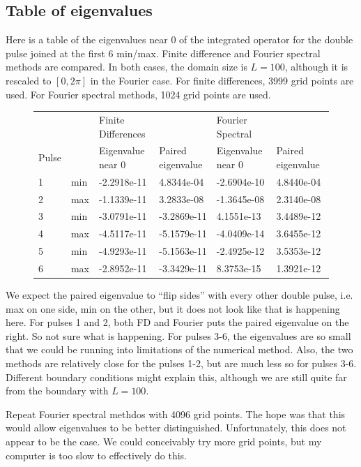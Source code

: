 \documentclass[12pt]{article}
\begin{document}
\subsection*{Table of eigenvalues}
Here is a table of the eigenvalues near 0 of the integrated operator for the double pulse joined at the first 6 min/max. Finite difference and Fourier spectral methods are compared. In both cases, the domain size is $L = 100$, although it is rescaled to $[0, 2\pi]$ in the Fourier case. For finite differences, 3999 grid points are used. For Fourier spectral methods, 1024 grid points are used.

\begin{figure}[H]
\begin{tabular}{ll|ll|ll}
      &     & Finite Differences &                   & Fourier Spectral  &                   \\
Pulse &     & Eigenvalue near 0  & Paired eigenvalue & Eigenvalue near 0 & Paired eigenvalue \\ \hline
1     & min & -2.2918e-11        & 4.8344e-04        & -2.6904e-10       & 4.8440e-04        \\
2     & max & -1.1339e-11        & 3.2833e-08        & -1.3645e-08       & 2.3140e-08        \\
3     & min & -3.0791e-11        & -3.2869e-11       & 4.1551e-13        & 3.4489e-12        \\
4     & max & -4.5117e-11        & -5.1579e-11       & -4.0409e-14       & 3.6455e-12        \\
5     & min & -4.9293e-11        & -5.1563e-11       & -2.4925e-12       & 3.5353e-12        \\
6     & max & -2.8952e-11        & -3.3429e-11       & 8.3753e-15        & 1.3921e-12       
\end{tabular}
\end{figure}
We expect the paired eigenvalue to ``flip sides'' with every other double pulse, i.e. max on one side, min on the other, but it does not look like that is happening here. For pulses 1 and 2, both FD and Fourier puts the paired eigenvalue on the right. So not sure what is happening. For pulses 3-6, the eigenvalues are so small that we could be running into limitations of the numerical method. Also, the two methods are relatively close for the pulses 1-2, but are much less so for pulses 3-6. Different boundary conditions might explain this, although we are still quite far from the boundary with $L = 100$.

Repeat Fourier spectral methdos with 4096 grid points. The hope was that this would allow eigenvalues to be better distinguished. Unfortunately, this does not appear to be the case. We could conceivably try more grid points, but my computer is too slow to effectively do this.
\end{document}
